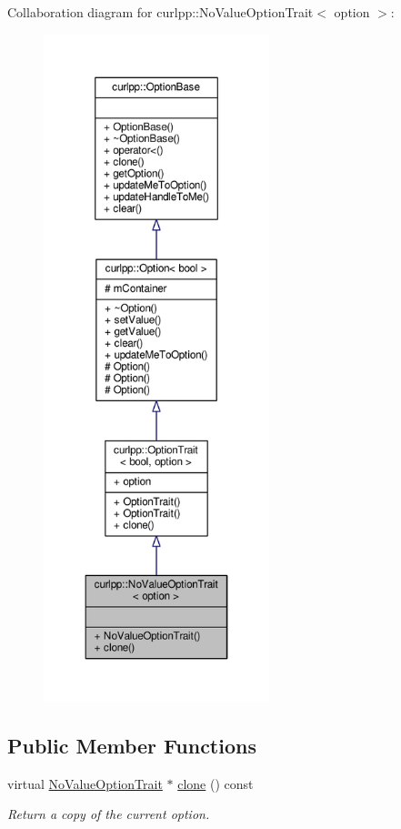 Collaboration diagram for curlpp\-:\-:No\-Value\-Option\-Trait$<$ option $>$\-:
\nopagebreak
\begin{figure}[H]
\begin{center}
\leavevmode
\includegraphics[height=550pt]{classcurlpp_1_1NoValueOptionTrait__coll__graph}
\end{center}
\end{figure}
\subsection*{Public Member Functions}
\begin{DoxyCompactItemize}
\item 
virtual \hyperlink{classcurlpp_1_1NoValueOptionTrait}{No\-Value\-Option\-Trait} $\ast$ \hyperlink{classcurlpp_1_1NoValueOptionTrait_af1e088d6a56673c18eaebe13b87fa743}{clone} () const 
\begin{DoxyCompactList}\small\item\em Return a copy of the current option. \end{DoxyCompactList}\end{DoxyCompactItemize}
